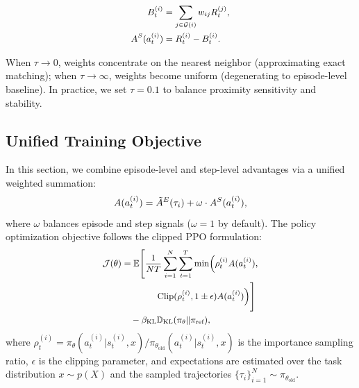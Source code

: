 \documentclass[11pt]{article}
\begin{document}
\begin{subequations}
\small
\label{eq:step_advantage}
\begin{align}
B_t^{(i)} &= \sum_{j \in \mathcal{G}(i)} w_{ij} R_t^{(j)}, \label{eq:soft_baseline} \\
A^S(a_t^{(i)}) &= R_t^{(i)} - B_t^{(i)}. \label{eq:step_adv}
\end{align}
\end{subequations}

When $\tau \to 0$, weights concentrate on the nearest neighbor (approximating exact matching); when $\tau \to \infty$, weights become uniform (degenerating to episode-level baseline). In practice, we set $\tau = 0.1$ to balance proximity sensitivity and stability.

\subsection{Unified Training Objective}
\label{sec:training}

In this section, we combine episode-level and step-level advantages via a unified weighted summation:
\begin{equation}
\small
\label{eq:combined_adv}
A(a_t^{(i)}) = \tilde{A}^E(\tau_i) + \omega \cdot A^S(a_t^{(i)}),
\end{equation}
where $\omega$ balances episode and step signals ($\omega = 1$ by default). The policy optimization objective follows the clipped PPO formulation:
\begin{equation}
\small
\label{eq:objective}
\begin{aligned}
\mathcal{J}(\theta) &= \mathbb{E} \Bigg[ \frac{1}{NT} \sum_{i=1}^N \sum_{t=1}^T \min\Bigl( \rho_t^{(i)} A(a_t^{(i)}), \\
&\qquad\qquad \text{Clip}(\rho_t^{(i)}, 1 \pm \epsilon) A(a_t^{(i)}) \Bigr) \Bigg] \\
&\quad - \beta_{\text{KL}} \mathbb{D}_{\text{KL}}(\pi_\theta \| \pi_{\text{ref}}),
\end{aligned}
\end{equation}
where $\rho_t^{(i)} = \pi_\theta(a_t^{(i)} | s_t^{(i)}, x) / \pi_{\theta_{\text{old}}}(a_t^{(i)} | s_t^{(i)}, x)$ is the importance sampling ratio, $\epsilon$ is the clipping parameter, and expectations are estimated over the task distribution $x \sim p(X)$ and the sampled trajectories $\{\tau_i\}_{i=1}^N \sim \pi_{\theta_{\text{old}}}$.
\end{document}
